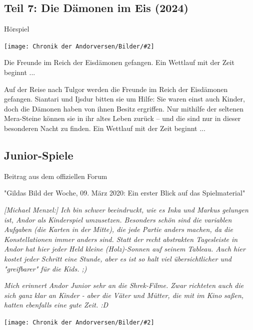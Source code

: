 \documentclass[10pt, a4paper, oneside]{book}
\newcommand{\fillbreak}{\vspace*{\fill}\columnbreak}
\newcommand{\produkt}[1]{%
    \section{#1}%
    \label{Produkt: #1}%
}
\newcommand{\bildmitts}[2][height=0.32\textwidth,width=0.48\textwidth,keepaspectratio]{%
    \begin{center}
        \texttt{[image: Chronik der Andorversen/Bilder/\#2]}
    \end{center}
}
\begin{document}
\begin{multicols}{2}
\fillbreak
\produkt{Teil 7: Die Dämonen im Eis (2024)}

\begin{center}
    Hörspiel
\end{center}

\bildmitts{Die Dämonen im Eis (2024).jpeg}

Die Freunde im Reich der Eisdämonen gefangen. Ein Wettlauf mit der Zeit beginnt ...

Auf der Reise nach Tulgor werden die Freunde im Reich der Eisdämonen gefangen. Siantari und Ijsdur bitten sie um Hilfe: Sie waren einst auch Kinder, doch die Dämonen haben von ihnen Besitz ergriffen. Nur mithilfe der seltenen Mera-Steine können sie in ihr altes Leben zurück – und die sind nur in dieser besonderen Nacht zu finden. Ein Wettlauf mit der Zeit beginnt ...














\begin{chapterbox}

    \chapter{Junior-Spiele}
    
    \begin{center}
        Beitrag aus dem offiziellen Forum

        "Gildas Bild der Woche, 09. März 2020: Ein erster Blick auf das Spielmaterial"
    \end{center}
    
    \textit{[Michael Menzel:] Ich bin schwer beeindruckt, wie es Inka und Markus gelungen ist, Andor als Kinderspiel umzusetzen. Besonders schön sind die variablen Aufgaben (die Karten in der Mitte), die jede Partie anders machen, da die Konstellationen immer anders sind. Statt der recht abstrakten Tagesleiste in Andor hat hier jeder Held kleine (Holz)-Sonnen auf seinem Tableau. Auch hier kostet jeder Schritt eine Stunde, aber es ist so halt viel übersichtlicher und "greifbarer" für die Kids. ;)}
    
    \textit{Mich erinnert Andor Junior sehr an die Shrek-Filme. Zwar richteten auch die sich ganz klar an Kinder - aber die Väter und Mütter, die mit im Kino saßen, hatten ebenfalls eine gute Zeit. :D}
    
    
    \bildmitts[width=\textwidth]{Andor Junior Feiern.jpeg}


\end{chapterbox}
\end{multicols}
\end{document}

